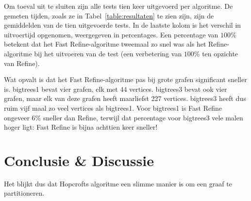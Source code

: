 \documentclass[twoside]{article}
\begin{document}
\begin{multicols}{2}
\begin{table}[H]
\begin{tabular}{lrrr}
\bottomrule
\end{tabular}
\end{table}


Om toeval uit te sluiten zijn alle tests tien keer uitgevoerd per algoritme. De gemeten tijden, zoals ze in Tabel~\ref{table:resultaten} te zien zijn, zijn de gemiddelden van de tien uitgevoerde tests. In de laatste kolom is het verschil in uitvoertijd opgenomen, weergegeven in percentages. Een percentage van $100$\% betekent dat het Fast Refine-algoritme tweemaal zo snel was als het Refine-algoritme bij het uitvoeren van de test (een verbetering van $100$\% ten opzichte van Refine).

Wat opvalt is dat het Fast Refine-algoritme pas bij grote grafen significant sneller is. bigtrees1 bevat vier grafen, elk met 44 vertices. bigtrees3 bevat ook vier grafen, maar elk van deze grafen heeft maarliefst 227 vertices. bigtrees3 heeft dus ruim vijf maal zo veel vertices als bigtrees1. Voor bigtrees1 is Fast Refine ongeveer 6\% sneller dan Refine, terwijl dat percentage voor bigtrees3 vele malen hoger ligt: Fast Refine is bijna achttien keer sneller! 

\section{Conclusie \& Discussie}
Het blijkt dus dat Hopcrofts algoritme een slimme manier is om een graaf te partitioneren. 

\lipsum[8] %


 




\end{multicols}
\end{document}
